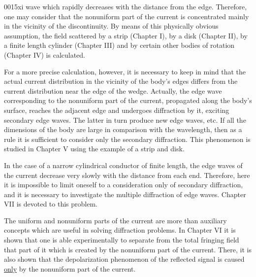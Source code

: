 \begin{scanpage}{0015}{xi}
wave which rapidly decreases with the distance from the edge. Therefore, one may consider that the nonuniform part of the current is concentrated mainly in the vicinity of the discontinuity. By means of this physically obvious assumption, the field scattered by a strip (Chapter I), by a disk (Chapter II), by a finite length cylinder (Chapter III) and by certain other bodies of rotation (Chapter IV) is calculated.

For a more precise calculation, however, it is necessary to keep in mind that the actual current distribution in the vicinity of the body's edges differs from the current distribution near the edge of the wedge. Actually, the edge wave corresponding to the nonuniform part of the current, propagated along the body's surface, reaches the adjacent edge and undergoes diffraction by it, exciting secondary edge waves. The latter in turn produce new edge waves, etc. If all the dimensions of the body are large in comparison with the wavelength, then as a rule it is sufficient to consider only the secondary diffraction. This phenomenon is studied in Chapter V using the example of a strip and disk.

In the case of a narrow cylindrical conductor of finite length, the edge waves of the current decrease very slowly with the distance from each end. Therefore, here it is impossible to limit oneself to a consideration only of secondary diffraction, and it is necessary to investigate the multiple diffraction of edge waves. Chapter VII is devoted to this problem.

The uniform and nonuniform parts of the current are more than auxiliary concepts which are useful in solving diffraction problems. In Chapter VI it is shown that one is able experimentally to separate from the total fringing field that part of it which is created by the nonuniform part of the current. There, it is also shown that the depolarization phenomenon of the reflected signal is caused \uline{only} by the nonuniform part of the current.
\end{scanpage}
